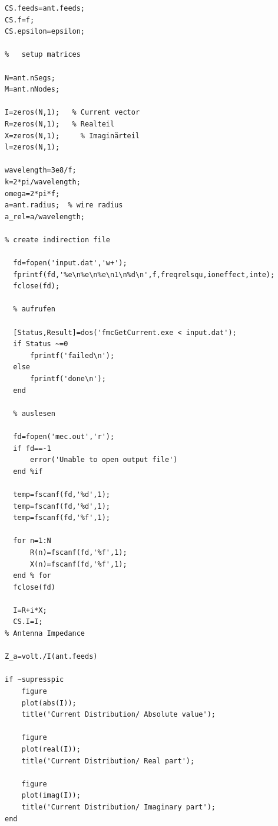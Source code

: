 \documentclass[a4paper,11pt]{thesis}
\begin{document}
\begin{verbatim}
CS.feeds=ant.feeds;
CS.f=f;
CS.epsilon=epsilon;

%   setup matrices

N=ant.nSegs;
M=ant.nNodes;

I=zeros(N,1);   % Current vector
R=zeros(N,1);   % Realteil
X=zeros(N,1);     % Imaginärteil
l=zeros(N,1);

wavelength=3e8/f;
k=2*pi/wavelength;
omega=2*pi*f;
a=ant.radius;  % wire radius
a_rel=a/wavelength;

% create indirection file

  fd=fopen('input.dat','w+');
  fprintf(fd,'%e\n%e\n%e\n1\n%d\n',f,freqrelsqu,ioneffect,inte);
  fclose(fd);

  % aufrufen

  [Status,Result]=dos('fmcGetCurrent.exe < input.dat');
  if Status ~=0
      fprintf('failed\n');
  else
      fprintf('done\n');
  end

  % auslesen

  fd=fopen('mec.out','r');
  if fd==-1
      error('Unable to open output file')
  end %if

  temp=fscanf(fd,'%d',1);
  temp=fscanf(fd,'%d',1);
  temp=fscanf(fd,'%f',1);

  for n=1:N
      R(n)=fscanf(fd,'%f',1);
      X(n)=fscanf(fd,'%f',1);
  end % for
  fclose(fd)

  I=R+i*X;
  CS.I=I;
% Antenna Impedance

Z_a=volt./I(ant.feeds)

if ~supresspic
    figure
    plot(abs(I));
    title('Current Distribution/ Absolute value');

    figure
    plot(real(I));
    title('Current Distribution/ Real part');

    figure
    plot(imag(I));
    title('Current Distribution/ Imaginary part');
end
\end{verbatim}
\normalsize
\backmatter




\listoffigures
\listoftables
\end{document}
